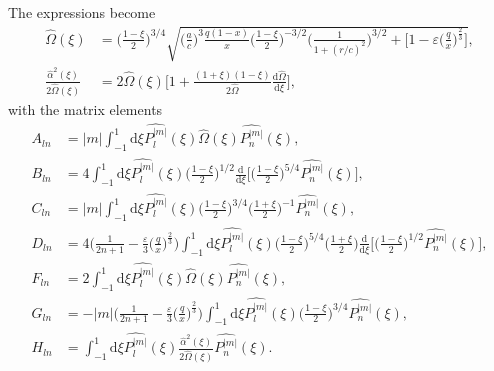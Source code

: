 \documentclass[11pt]{article}
\newcommand{\rd}{\mathrm{d}}
\newcommand{\Pnm}{P_n^{|m|}}
\newcommand{\Plm}{P_l^{|m|}}
\newcommand{\hPnm}{\widehat{\Pnm}}
\newcommand{\hPlm}{\widehat{\Plm}}
\newcommand{\hOmega}{\widehat{\Omega}}
\newcommand{\halpha}{\widehat{\alpha}}
\begin{document}
The expressions become
\begin{align*}
\hOmega(\xi) &=\bigg(\frac{1-\xi}{2}\bigg)^{3/4}  \sqrt{\bigg( \frac{a}{c}\bigg)^3\frac{q(1-x)}{x} \bigg(\frac{1-\xi}{2}\bigg)^{-3/2} \bigg(\frac{1}{1+(r/c)^2}\bigg)^{3/2} 
+   \bigg[1- \varepsilon\bigg(\frac{q}{x}\bigg)^{\frac{2}{3}} \bigg]  } , \\
\frac{\halpha^2(\xi)}{2\hOmega(\xi)} & = 2\hOmega(\xi) \bigg[1+\frac{(1+\xi)(1-\xi)}{2\hOmega}\frac{\rd \hOmega }{\rd \xi} \bigg],
\end{align*}
with the matrix elements
\begin{align*}
A_{ln} &= |m| \int_{-1}^{1} \rd \xi  \hPlm(\xi)\hOmega(\xi)\hPnm(\xi) , \\
B_{ln} &= 4 \int_{-1}^{1} \rd \xi  \hPlm(\xi) \bigg(\frac{1-\xi}{2}\bigg)^{1/2} \frac{\rd}{\rd \xi} \bigg[\bigg(\frac{1-\xi}{2}\bigg)^{5/4}\hPnm(\xi)\bigg], \\
C_{ln} &= |m| \int_{-1}^{1} \rd \xi \hPlm(\xi) \bigg(\frac{1-\xi}{2}\bigg)^{3/4}\bigg(\frac{1+\xi}{2}\bigg)^{-1}   \hPnm(\xi), \\
D_{ln} &= 4 \bigg(\frac{1}{2n+1}-\frac{\varepsilon}{3}  \bigg(\frac{q}{x}\bigg)^{\frac{2}{3}} \bigg) \int_{-1}^{1} \rd \xi \hPlm(\xi)  \bigg(\frac{1-\xi}{2}\bigg)^{5/4} \bigg(\frac{1+\xi}{2}\bigg) 
\frac{\rd}{\rd \xi} \bigg[ \bigg(\frac{1-\xi}{2}\bigg)^{1/2}\hPnm(\xi) \bigg] ,\\
F_{ln} &=2 \int_{-1}^{1} \rd \xi  \hPlm(\xi)\hOmega(\xi)\hPnm(\xi) , \\
G_{ln} &= -|m| \bigg(\frac{1}{2n+1}-\frac{\varepsilon}{3}  \bigg(\frac{q}{x}\bigg)^{\frac{2}{3}} \bigg)  \int_{-1}^{1} \rd \xi \hPlm(\xi)  \bigg(\frac{1-\xi}{2}\bigg)^{3/4} 
\hPnm(\xi)  ,\\
H_{ln} &=  \int_{-1}^{1} \rd \xi  \hPlm(\xi)\frac{\halpha^2(\xi)}{2\hOmega(\xi)}\hPnm(\xi) .
\end{align*}
\end{document}
